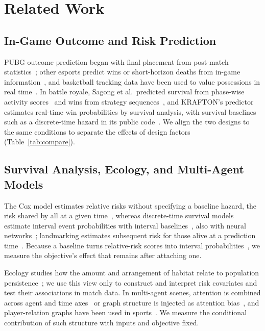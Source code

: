 \documentclass[conference]{IEEEtran}
\begin{document}
\section{Related Work}
\label{sec:related}

\subsection{In-Game Outcome and Risk Prediction}
\label{sec:related:esports}
PUBG outcome prediction began with final placement from post-match statistics~\cite{KagglePUBG,LeeLee25}; other esports predict wins or short-horizon deaths from in-game information~\cite{Hodge21,Katona19,Marshall22}, and basketball tracking data have been used to value possessions in real time~\cite{Cervone16}.
In battle royale, Sagong et al.\ predicted survival from phase-wise activity scores~\cite{Sagong25a} and wins from strategy sequences~\cite{Sagong25b}, and KRAFTON's predictor estimates real-time win probabilities by survival analysis, with survival baselines such as a discrete-time hazard in its public code~\cite{KRAFTON}.
We align the two designs to the same conditions to separate the effects of design factors (Table~\ref{tab:compare}).

\subsection{Survival Analysis, Ecology, and Multi-Agent Models}
\label{sec:related:survival}
The Cox model estimates relative risks without specifying a baseline hazard, the risk shared by all at a given time~\cite{Cox72}, whereas discrete-time survival models estimate interval event probabilities with interval baselines~\cite{SingerWillett93}, also with neural networks~\cite{Gensheimer19}; landmarking estimates subsequent risk for those alive at a prediction time~\cite{vanHouwelingen07}.
Because a baseline turns relative-risk scores into interval probabilities~\cite{PrenticeGloeckler78}, we measure the objective's effect that remains after attaching one.

Ecology studies how the amount and arrangement of habitat relate to population persistence~\cite{Fahrig03}; we use this view only to construct and interpret risk covariates and test their associations in match data.
In multi-agent scenes, attention is combined across agent and time axes~\cite{Ngiam22} or graph structure is injected as attention bias~\cite{Ying21}, and player-relation graphs have been used in sports~\cite{Xenopoulos21}.
We measure the conditional contribution of such structure with inputs and objective fixed.
\end{document}
